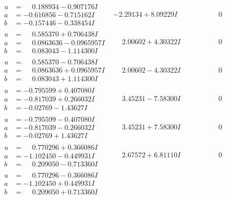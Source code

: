 \documentclass[1p]{elsarticle_modified}
\theoremstyle{definition}
\begin{document}
$$\begin{array}{c|c|c}
\begin{aligned}
u &= \phantom{-}0.188934 - 0.907176 I \\
a &= -0.616856 - 0.715162 I \\
b &= -0.157446 - 0.338454 I\end{aligned}
 & -2.29134 + 8.09229 I & \phantom{-0.000000 } 0 \\ \hline\begin{aligned}
u &= \phantom{-}0.585370 + 0.706438 I \\
a &= \phantom{-}0.0863636 - 0.0965957 I \\
b &= \phantom{-}0.083043 - 1.114300 I\end{aligned}
 & \phantom{-}2.00602 + 4.30322 I & \phantom{-0.000000 } 0 \\ \hline\begin{aligned}
u &= \phantom{-}0.585370 - 0.706438 I \\
a &= \phantom{-}0.0863636 + 0.0965957 I \\
b &= \phantom{-}0.083043 + 1.114300 I\end{aligned}
 & \phantom{-}2.00602 - 4.30322 I & \phantom{-0.000000 } 0 \\ \hline\begin{aligned}
u &= -0.795599 + 0.407080 I \\
a &= -0.817039 + 0.266032 I \\
b &= -0.02769 - 1.43627 I\end{aligned}
 & \phantom{-}3.45231 - 7.58300 I & \phantom{-0.000000 } 0 \\ \hline\begin{aligned}
u &= -0.795599 - 0.407080 I \\
a &= -0.817039 - 0.266032 I \\
b &= -0.02769 + 1.43627 I\end{aligned}
 & \phantom{-}3.45231 + 7.58300 I & \phantom{-0.000000 } 0 \\ \hline\begin{aligned}
u &= \phantom{-}0.770296 + 0.366086 I \\
a &= -1.102450 - 0.449931 I \\
b &= \phantom{-}0.209050 - 0.713360 I\end{aligned}
 & \phantom{-}2.67572 + 6.81110 I & \phantom{-0.000000 } 0 \\ \hline\begin{aligned}
u &= \phantom{-}0.770296 - 0.366086 I \\
a &= -1.102450 + 0.449931 I \\
b &= \phantom{-}0.209050 + 0.713360 I\end{aligned}

\end{array}$$
\end{document}
